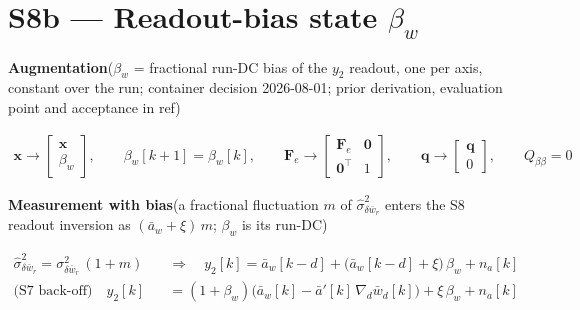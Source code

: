 

\section*{S8b --- Readout-bias state $\beta_w$}

\textbf{Augmentation}\quad ($\beta_w$ = fractional run-DC bias of the
$y_2$ readout, one per axis, constant over the run; container decision
2026-08-01; prior derivation, evaluation point and acceptance in ref)

\begin{align*}
\mathbf{x} \to
\begin{bmatrix} \mathbf{x} \\ \beta_w \end{bmatrix},
\qquad
\beta_w[k+1] = \beta_w[k],
\qquad
\mathbf{F}_e \to
\begin{bmatrix} \mathbf{F}_e & \mathbf{0} \\ \mathbf{0}^{\top} & 1
\end{bmatrix},
\qquad
\mathbf{q} \to \begin{bmatrix} \mathbf{q} \\ 0 \end{bmatrix},
\qquad
Q_{\beta\beta} = 0
\end{align*}

\textbf{Measurement with bias}\quad (a fractional fluctuation $m$ of
$\hat{\sigma}^2_{\delta\bar{w}_r}$ enters the S8 readout inversion as
$(\bar{a}_w+\xi)\,m$; $\beta_w$ is its run-DC)

\begin{align*}
\hat{\sigma}^2_{\delta\bar{w}_r}
  = \sigma^2_{\delta\bar{w}_r}\,(1+m)
\quad&\Longrightarrow\quad
y_2[k] = \bar{a}_w[k-d]
  + \bigl(\bar{a}_w[k-d]+\xi\bigr)\,\beta_w + n_a[k] \\
\text{(S7 back-off)}\quad
y_2[k] &= (1+\beta_w)\bigl(\bar{a}_w[k]
  - \bar{a}'[k]\,\nabla_d\bar{w}_d[k]\bigr) + \xi\,\beta_w + n_a[k]
\end{align*}

